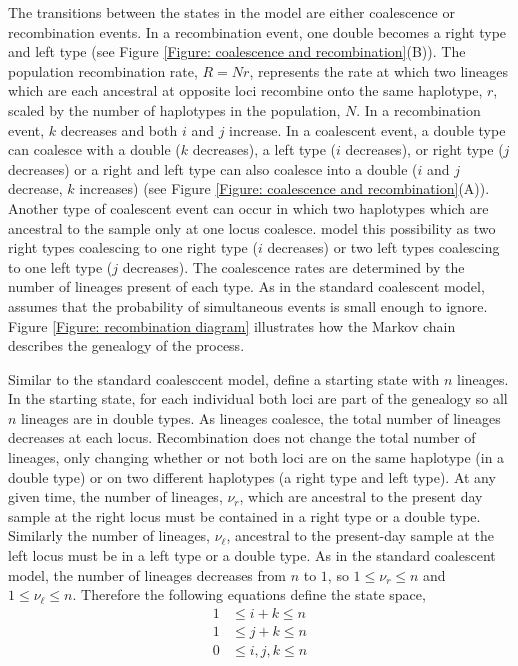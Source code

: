 \documentclass[11pt,oneside]{amsart}
\begin{document}

The transitions between the states in the \cite{SimonsenChurchill1997} model are either coalescence or recombination events. In a recombination event, one double becomes a right type and left type (see Figure \ref{Figure: coalescence and recombination}(B)). The population recombination rate, $R = Nr$, represents the rate at which two lineages which are each ancestral at opposite loci recombine onto the same haplotype, $r$, scaled by the number of haplotypes in the population, $N$. In a recombination event, $k$ decreases and both $i$ and $j$ increase. In a coalescent event, a double type can coalesce with a double ($k$ decreases), a left type ($i$ decreases), or right type ($j$ decreases) or a right and left type can also coalesce into a double ($i$ and $j$ decrease, $k$ increases) (see Figure \ref{Figure: coalescence and recombination}(A)). Another type of coalescent event can occur in which two haplotypes which are ancestral to the sample only at one locus coalesce. \cite{SimonsenChurchill1997} model this possibility as two right types coalescing to one right type ($i$ decreases) or two left types coalescing to one left type ($j$ decreases). The coalescence rates are determined by the number of lineages present of each type. As in the standard coalescent model, \cite{SimonsenChurchill1997} assumes that the probability of simultaneous events is small enough to ignore. Figure \ref{Figure: recombination diagram} illustrates how the Markov chain describes the genealogy of the process.


Similar to the standard coalesccent model, \cite{SimonsenChurchill1997} define a starting state with $n$ lineages. In the starting state, for each individual both loci are part of the genealogy so all $n$ lineages are in double types. As lineages coalesce, the total number of lineages decreases at each locus. Recombination does not change the total number of lineages, only changing whether or not both loci are on the same haplotype (in a double type) or on two different haplotypes (a right type and left type). At any given time, the number of lineages, $\nu_{r}$, which are ancestral to the present day sample at the right locus must be contained in a right type or a double type. Similarly the number of lineages, $\nu_{\ell}$, ancestral to the present-day sample at the left locus must be in a left type or a double type. As in the standard coalescent model, the number of lineages decreases from $n$ to $1$, so $1 \leq \nu_r \leq n$ and $1 \leq \nu_{\ell} \leq n$. Therefore the following equations define the state space,
\begin{align}
1 &\leq i+k \leq n \label{Eqn: i + k leq n} \\
1 &\leq j+k \leq n \label{Eqn: j + k leq n}  \\
0 &\leq i,j,k \leq n \label{Eqn: all geq 0}
\end{align}
\end{document}
